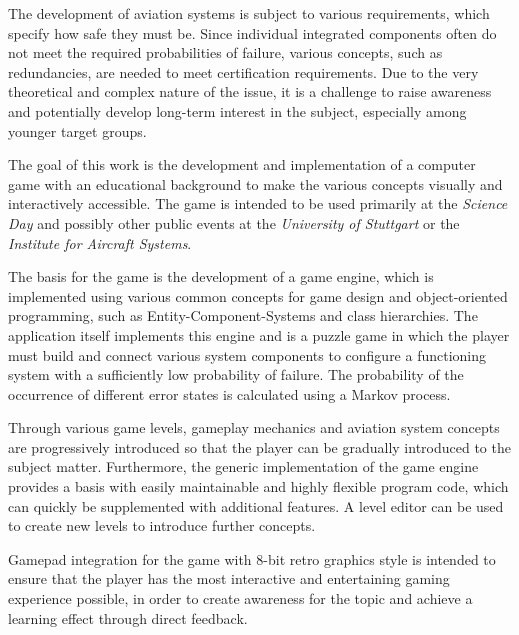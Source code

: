 
{\LARGE \thetitle}
The development of aviation systems is subject to various requirements, which specify how safe they must be.
Since individual integrated components often do not meet the required probabilities of failure, various concepts,
such as redundancies, are needed to meet certification requirements.
Due to the very theoretical and complex nature of the issue, it is a challenge to raise awareness and potentially develop
long-term interest in the subject, especially among younger target groups.

The goal of this work is the development and implementation of a computer game with an educational background to make the
various concepts visually and interactively accessible.
The game is intended to be used primarily at the \textit{Science Day} and possibly other public events at the
\textit{University of Stuttgart} or the \textit{Institute for Aircraft Systems}.

The basis for the game is the development of a game engine, which is implemented using various common concepts for
game design and object-oriented programming, such as Entity-Component-Systems and class hierarchies.
The application itself implements this engine and is a puzzle game in which the player must build and connect
various system components to configure a functioning system with a sufficiently low probability of failure.
The probability of the occurrence of different error states is calculated using a Markov process.

Through various game levels, gameplay mechanics and aviation system concepts are progressively introduced so that the
player can be gradually introduced to the subject matter.
Furthermore, the generic implementation of the game engine provides a basis with easily maintainable and highly flexible
program code, which can quickly be supplemented with additional features.
A level editor can be used to create new levels to introduce further concepts.

Gamepad integration for the game with 8-bit retro graphics style is intended to ensure
that the player has the most interactive and entertaining gaming experience possible,
in order to create awareness for the topic and achieve a learning effect through direct feedback.


